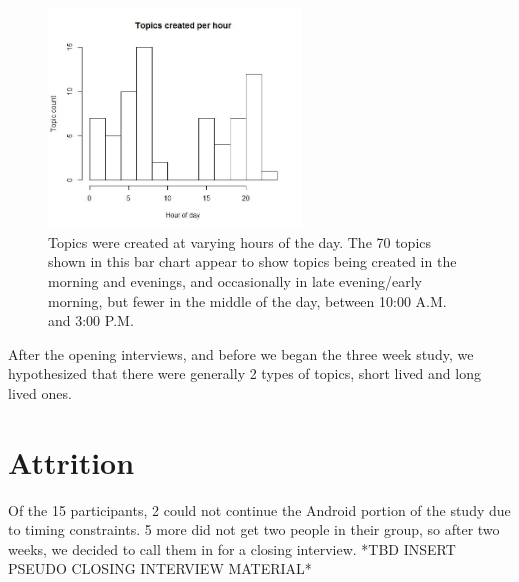     \begin{figure}
    \centering
    \includegraphics[width=0.6\textwidth]{topics_per_hour.jpg}
    \caption[Topics Created by Hour of Day]{
      Topics were created at varying hours of the day.
      The 70 topics shown in this bar chart appear to show
      topics being created in the morning and evenings,
      and occasionally in late evening/early morning,
      but fewer in the middle of the day, between 10:00 A.M. and 3:00 P.M.
    }
    \label{fig:topic_hours}
    \end{figure}

    After the opening interviews, and before we began the three week study,
    we hypothesized that there were generally 2 types of topics,
    short lived and long lived ones.



    


  \section{Attrition}
  \label{sec:Android}
  Of the 15 participants, 2 could not continue the Android portion
  of the study due to timing constraints.
  5 more did not get two people in their group,
  so after two weeks,
  we decided to call them in for a closing interview.
  *TBD INSERT PSEUDO CLOSING INTERVIEW MATERIAL*

